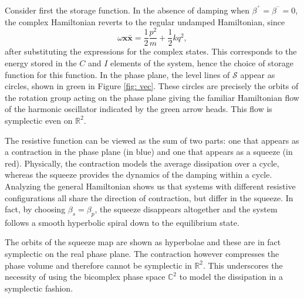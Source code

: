 \documentclass{article}
\begin{document}
Consider first the storage function.  
In the absence of damping when $\beta^{{}^+}=\beta^{{}^-} = 0$, the complex Hamiltonian reverts to the regular undamped Hamiltonian, since
\begin{equation}
   \omega\textbf{x}\bar{\textbf{x}} =
\frac{1}{2}\frac{p^2}{m} + \frac{1}{2} k q^2,  
\end{equation}
after substituting the expressions for the complex states.  This corresponds to the energy stored in the $C$ and $I$ elements of the system, hence the choice of  storage function for this function.  In the phase plane, the level lines of $\mathcal{S}$ appear as  circles,  shown in green in Figure \ref{fig: vec}.  These circles are precisely the orbits of the rotation group acting on the phase plane giving the familiar Hamiltonian flow of the harmonic oscillator indicated by the green arrow heads.  This flow is symplectic even on $\mathbb{R}^2$. 

The resistive function can be viewed as the sum of two parts: one that appears as a contraction in the phase plane (in blue) and one that appears as a squeeze (in red).
Physically, the contraction models the average dissipation over a cycle, whereas the squeeze provides the dynamics of the  damping within a cycle.
Analyzing the general Hamiltonian shows us that systems with different resistive configurations all share the direction of contraction, but differ in the squeeze. 
In fact, by choosing $\beta_s=\beta_p$, the squeeze disappears altogether and the system follows a smooth hyperbolic spiral down to the equilibrium state.

The orbits of the squeeze map are shown as hyperbolae and these are in fact symplectic on the real phase plane.  
The contraction however compresses the phase volume and therefore cannot be symplectic in $\mathbb{R}^2$.  
This underscores the necessity of using the bicomplex phase space  $\mathbb{C}^2$ to model the dissipation in a symplectic fashion.
\end{document}
